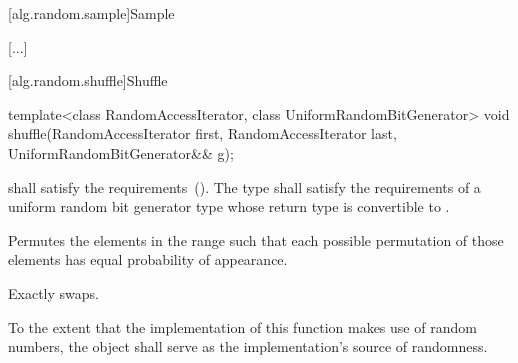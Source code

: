 [alg.random.sample]{Sample}

[...]

[alg.random.shuffle]{Shuffle}

%
\begin{itemdecl}
template<class RandomAccessIterator, class UniformRandomBitGenerator>
  void shuffle(RandomAccessIterator first,
               RandomAccessIterator last,
               UniformRandomBitGenerator&& g);
\end{itemdecl}

\begin{itemdescr}
\pnum
\requires
{} shall satisfy the
 requirements~().
The type
shall satisfy the requirements of a
uniform random bit generator type whose return type is
convertible to
.

\pnum
\effects
Permutes the elements in the range
such that each possible permutation of those elements has equal probability of appearance.

\pnum
\complexity
Exactly
swaps.

\pnum
\remarks
To the extent that the implementation of this function makes use of random
numbers, the object  shall serve as the implementation's source of
randomness.
\end{itemdescr}

